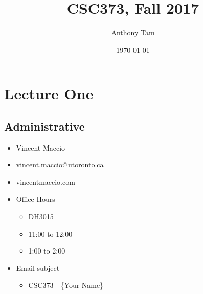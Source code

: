 \documentclass[11pt]{article}
\author{Anthony Tam}
\date{\today}
\title{CSC373, Fall 2017}
\begin{document}
\maketitle

\section*{Lecture One}
\label{sec:org337b1ad}
\subsection*{Administrative}
\label{sec:orga749f19}
\begin{itemize}
\item Vincent Maccio
\item vincent.maccio@utoronto.ca
\item vincentmaccio.com
\item Office Hours
\begin{itemize}
\item DH3015
\item 11:00 to 12:00
\item 1:00 to 2:00
\end{itemize}
\item Email subject
\begin{itemize}
\item CSC373 - \{Your Name\}
\end{itemize}
\end{itemize}
\end{document}
